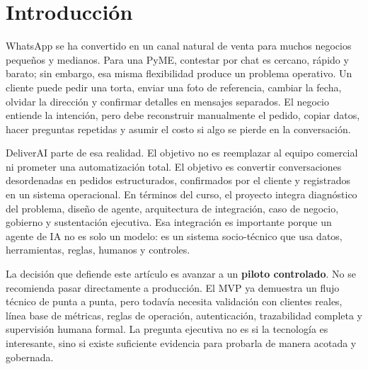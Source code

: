 \section{Introducción}

WhatsApp se ha convertido en un canal natural de venta para muchos negocios pequeños y medianos. Para una PyME, contestar por chat es cercano, rápido y barato; sin embargo, esa misma flexibilidad produce un problema operativo. Un cliente puede pedir una torta, enviar una foto de referencia, cambiar la fecha, olvidar la dirección y confirmar detalles en mensajes separados. El negocio entiende la intención, pero debe reconstruir manualmente el pedido, copiar datos, hacer preguntas repetidas y asumir el costo si algo se pierde en la conversación.

DeliverAI parte de esa realidad. El objetivo no es reemplazar al equipo comercial ni prometer una automatización total. El objetivo es convertir conversaciones desordenadas en pedidos estructurados, confirmados por el cliente y registrados en un sistema operacional. En términos del curso, el proyecto integra diagnóstico del problema, diseño de agente, arquitectura de integración, caso de negocio, gobierno y sustentación ejecutiva. Esa integración es importante porque un agente de IA no es solo un modelo: es un sistema socio-técnico que usa datos, herramientas, reglas, humanos y controles.

La decisión que defiende este artículo es avanzar a un \textbf{piloto controlado}. No se recomienda pasar directamente a producción. El MVP ya demuestra un flujo técnico de punta a punta, pero todavía necesita validación con clientes reales, línea base de métricas, reglas de operación, autenticación, trazabilidad completa y supervisión humana formal. La pregunta ejecutiva no es si la tecnología es interesante, sino si existe suficiente evidencia para probarla de manera acotada y gobernada.
